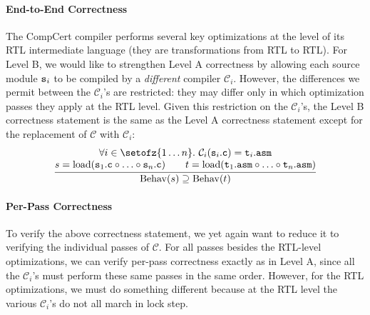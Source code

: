 \paragraph{End-to-End Correctness}

The CompCert compiler performs several key optimizations at the level
of its RTL intermediate language (\ie they are transformations from
RTL to RTL).  For Level B, we would like to strengthen Level A
correctness by allowing each source module $\mathtt{s}_{i}$ to be compiled by
a \emph{different} compiler $\mathcal{C}_i$.  However, the differences
we permit between the $\mathcal{C}_i$'s are restricted: they may
differ only in which optimization passes they apply at the RTL level.
Given this restriction on the $\mathcal{C}_i$'s, the Level B
correctness statement is the same as the Level A correctness statement
except for the replacement of $\mathcal{C}$ with $\mathcal{C}_i$:
\[
\frac{
\begin{array}{@{}c@{}}
\forall i\in\setofz{1\ldots n}.~\mathcal{C}_i(\mathtt{s}_i\mathtt{.c}) = \mathtt{t}_i\mathtt{.asm} \\
s = \mathrm{load}(\mathtt{s}_1\mathtt{.c}\circ \ldots \circ \mathtt{s}_n\mathtt{.c})\qquad
t = \mathrm{load}(\mathtt{t}_1\mathtt{.asm}\circ \ldots \circ \mathtt{t}_n\mathtt{.asm})
\end{array}
}
{
\mathrm{Behav}(s) 
\supseteq \mathrm{Behav}(t)
}
\]

\paragraph{Per-Pass Correctness}

To verify the above correctness statement, we yet again want to reduce
it to verifying the individual passes of $\mathcal{C}$.  For all passes
besides the RTL-level optimizations, we can verify per-pass
correctness exactly as in Level A, since all the $\mathcal{C}_i$'s must
perform these same passes in the same order.  However, for the RTL
optimizations, we must do something different because at the RTL level
the various $\mathcal{C}_i$'s do not all march in lock step.

